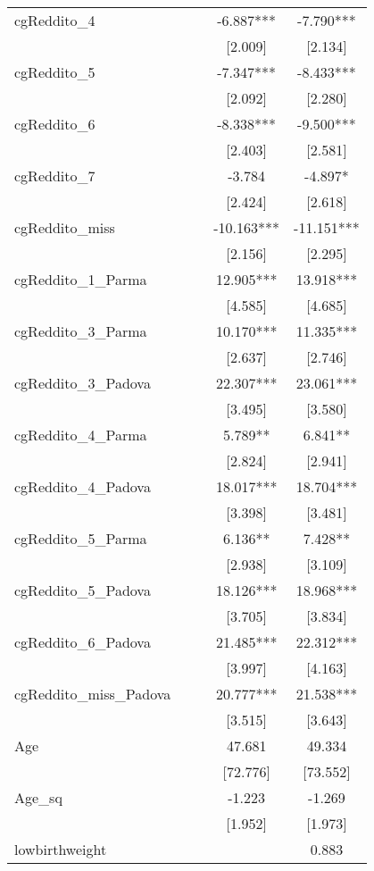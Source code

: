 \documentclass[]{article}
\begin{document}
\begin{tabular}{lcccc}
cgReddito\_4 &  &  & -6.887*** & -7.790*** \\
 &  &  & [2.009] & [2.134] \\
cgReddito\_5 &  &  & -7.347*** & -8.433*** \\
 &  &  & [2.092] & [2.280] \\
cgReddito\_6 &  &  & -8.338*** & -9.500*** \\
 &  &  & [2.403] & [2.581] \\
cgReddito\_7 &  &  & -3.784 & -4.897* \\
 &  &  & [2.424] & [2.618] \\
cgReddito\_miss &  &  & -10.163*** & -11.151*** \\
 &  &  & [2.156] & [2.295] \\
cgReddito\_1\_Parma &  &  & 12.905*** & 13.918*** \\
 &  &  & [4.585] & [4.685] \\
cgReddito\_3\_Parma &  &  & 10.170*** & 11.335*** \\
 &  &  & [2.637] & [2.746] \\
cgReddito\_3\_Padova &  &  & 22.307*** & 23.061*** \\
 &  &  & [3.495] & [3.580] \\
cgReddito\_4\_Parma &  &  & 5.789** & 6.841** \\
 &  &  & [2.824] & [2.941] \\
cgReddito\_4\_Padova &  &  & 18.017*** & 18.704*** \\
 &  &  & [3.398] & [3.481] \\
cgReddito\_5\_Parma &  &  & 6.136** & 7.428** \\
 &  &  & [2.938] & [3.109] \\
cgReddito\_5\_Padova &  &  & 18.126*** & 18.968*** \\
 &  &  & [3.705] & [3.834] \\
cgReddito\_6\_Padova &  &  & 21.485*** & 22.312*** \\
 &  &  & [3.997] & [4.163] \\
cgReddito\_miss\_Padova &  &  & 20.777*** & 21.538*** \\
 &  &  & [3.515] & [3.643] \\
Age &  &  & 47.681 & 49.334 \\
 &  &  & [72.776] & [73.552] \\
Age\_sq &  &  & -1.223 & -1.269 \\
 &  &  & [1.952] & [1.973] \\
lowbirthweight &  &  &  & 0.883 \\

\end{tabular}
\end{document}
